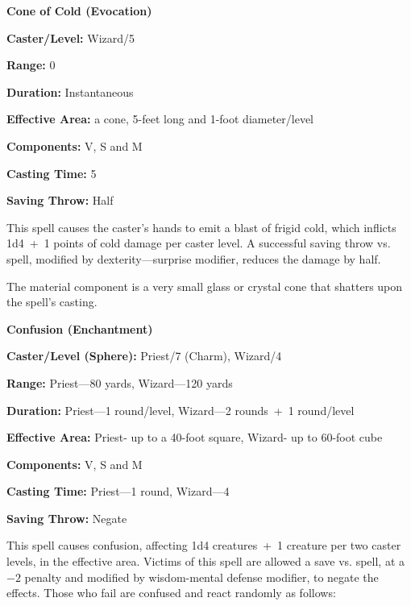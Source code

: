 \begin{multicols}{2}
\begin{minipage}{\columnwidth}
\noindent \textbf{Cone of Cold (Evocation)}

\noindent \textbf{Caster/Level:} Wizard/5

\noindent \textbf{Range:} 0

\noindent \textbf{Duration:} Instantaneous

\noindent \textbf{Effective Area:} a cone, 5-feet long and 1-foot diameter/level

\noindent \textbf{Components:} V, S and M

\noindent \textbf{Casting Time:} 5

\noindent \textbf{Saving Throw:} Half

\end{minipage}

This spell causes the caster's hands to emit a blast of frigid cold, which inflicts 1d4~+~1 points of cold damage per caster level.  A successful saving throw vs. spell, modified by dexterity---surprise modifier, reduces the damage by half.

The material component is a very small glass or crystal cone that shatters upon the spell's casting.

\vspace{1em}

\noindent
\begin{minipage}{\columnwidth}

\noindent \textbf{Confusion (Enchantment)}

\noindent \textbf{Caster/Level (Sphere):} Priest/7 (Charm), Wizard/4

\noindent \textbf{Range:} Priest---80 yards, Wizard---120 yards

\noindent \textbf{Duration:} Priest---1 round/level, Wizard---2 rounds~+~1 round/level

\noindent \textbf{Effective Area:} Priest- up to a 40-foot square, Wizard- up to 60-foot cube

\noindent \textbf{Components:} V, S and M

\noindent \textbf{Casting Time:} Priest---1 round, Wizard---4

\noindent \textbf{Saving Throw:} Negate

\end{minipage}

This spell causes confusion, affecting 1d4 creatures~+~1 creature per two caster levels, in the effective area.  Victims of this spell are allowed a save vs. spell, at a $-2$ penalty and modified by wisdom-mental defense modifier, to negate the effects.  Those who fail are confused and react randomly as follows:


\end{multicols}
